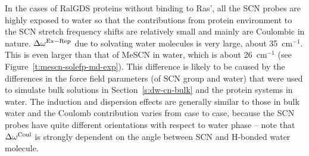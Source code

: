 \documentclass[a4paper,titlepage,twoside,fleqn,12pt]{book}
\begin{document}
\begin{refsection}
In the cases of RalGDS proteins without binding to Ras',
all the SCN probes are highly exposed to water so
that the contributions from protein environment to the SCN
stretch frequency shifts are relatively small and mainly are
Coulombic in nature. $\Delta\omega^{\rm Ex-Rep}$ due to solvating water molecules
is very large, about 35~cm$^{-1}$. This is even larger than that of
MeSCN in water, which is about 26~cm$^{-1}$ (see Figure~\ref{t:mescn-solefp-md-exp}).
This difference is likely to be caused by the differences in
the force field parameters (of SCN group and water) that were
used to simulate bulk solutions in Section~\ref{s:dw-cn-bulk} and the protein
systems in water. The induction and dispersion effects are
generally similar to those in bulk water and the Coulomb
contribution varies from case to case, because the SCN probes
have quite different orientations with respect to water phase --
note that $\Delta\omega^{\rm Coul}$ is strongly dependent on the angle between
SCN and H-bonded water molecule.


\end{refsection}
\end{document}
